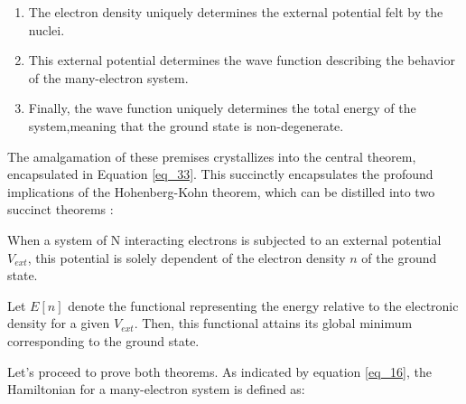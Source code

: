 \begin{enumerate}
    \item The electron density uniquely determines the external potential felt by the nuclei.
    \item This external potential determines the wave function describing the behavior of the many-electron system.
    \item Finally, the wave function uniquely determines the total energy of the system,meaning that the ground state is non-degenerate.
\end{enumerate}
The amalgamation of these premises crystallizes into the central theorem, encapsulated in Equation \ref{eq_33}. This succinctly encapsulates the profound implications of the Hohenberg-Kohn theorem\supercite{Hohenberg1964}, which can be distilled into two succinct theorems \supercite{Dresselhaus2018}:
\begin{theorem}{}{}  \label{HK1}
When a system of N interacting electrons is subjected to an external potential $V_{ext}$, this potential is solely dependent of the electron density $n$ of the ground state. 
\end{theorem}
\begin{theorem}{}{} \label{HK2}
Let $E[n]$ denote the functional representing the energy relative to the electronic density for a given $V_{ext}$. Then, this functional attains its global minimum corresponding to the ground state.
\end{theorem}

Let's proceed to prove both theorems. As indicated by equation \ref{eq_16}, the Hamiltonian for a many-electron system is defined as:


